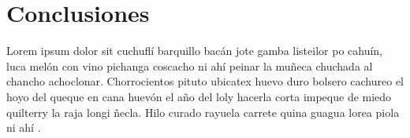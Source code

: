 \chapter{Conclusiones}
\label{cap:conclusiones}
Lorem ipsum dolor sit cuchuflí barquillo bacán jote gamba listeilor po cahuín, luca melón con vino pichanga coscacho ni ahí peinar la muñeca chuchada al chancho achoclonar. Chorrocientos pituto ubicatex huevo duro bolsero cachureo el hoyo del queque en cana huevón el año del loly hacerla corta impeque de miedo quilterry la raja longi ñecla. Hilo curado rayuela carrete quina guagua lorea piola ni ahí \citep{samza}.